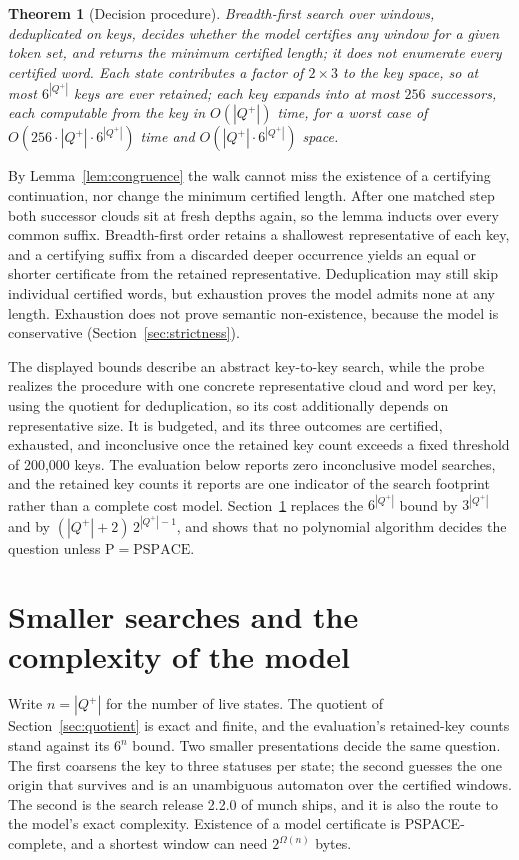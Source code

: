 \documentclass[11pt,a4paper]{article}
\theoremstyle{definition}
\theoremstyle{plain}
\newtheorem{theorem}{Theorem}
\begin{document}
\begin{theorem}[Decision procedure]
\label{thm:decision}
Breadth-first search over windows, deduplicated on keys, decides whether the model certifies any window for a given
token set, and returns the minimum certified length; it does not enumerate every certified word. Each state contributes
a factor of $2 \times 3$ to the key space, so at most $6^{|Q^+|}$ keys are ever retained; each key expands into at most
$256$ successors, each computable from the key in $O(|Q^+|)$ time, for a worst case of
$O(256 \cdot |Q^+| \cdot 6^{|Q^+|})$ time and $O(|Q^+| \cdot 6^{|Q^+|})$ space.
\end{theorem}

By Lemma~\ref{lem:congruence} the walk cannot miss the existence of a certifying continuation, nor change the minimum
certified length. After one matched step both successor clouds sit at fresh depths again, so the lemma inducts over
every common suffix. Breadth-first order retains a shallowest representative of each key, and a certifying suffix from a
discarded deeper occurrence yields an equal or shorter certificate from the retained representative. Deduplication may
still skip individual certified words, but exhaustion proves the model admits none at any length. Exhaustion does not
prove semantic non-existence, because the model is conservative (Section~\ref{sec:strictness}).

The displayed bounds describe an abstract key-to-key search, while the probe realizes the procedure with one concrete
representative cloud and word per key, using the quotient for deduplication, so its cost additionally depends on
representative size. It is budgeted, and its three outcomes are certified, exhausted, and inconclusive once the retained
key count exceeds a fixed threshold of 200{,}000 keys. The evaluation below reports zero inconclusive model searches,
and the retained key counts it reports are one indicator of the search footprint rather than a complete cost model.
Section~\ref{sec:smaller} replaces the $6^{|Q^+|}$ bound by $3^{|Q^+|}$ and by $(|Q^+| + 2)\, 2^{|Q^+| - 1}$, and shows
that no polynomial algorithm decides the question unless $\mathrm{P} = \mathrm{PSPACE}$.

\section{Smaller searches and the complexity of the model}
\label{sec:smaller}

Write $n = |Q^+|$ for the number of live states. The quotient of Section~\ref{sec:quotient} is exact and finite, and the
evaluation's retained-key counts stand against its $6^n$ bound. Two smaller presentations decide the same question. The
first coarsens the key to three statuses per state; the second guesses the one origin that survives and is an
unambiguous automaton over the certified windows. The second is the search release 2.2.0 of munch ships, and it is also
the route to the model's exact complexity. Existence of a model certificate is PSPACE-complete, and a shortest window
can need $2^{\Omega(n)}$ bytes.
\end{document}
